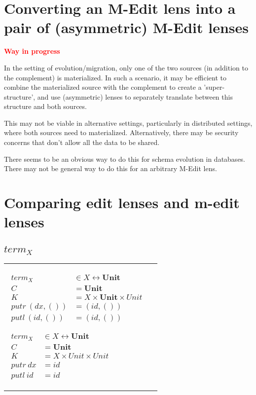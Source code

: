 \documentclass[a4paper,10pt]{article}
\newcommand{\finish}[1]{#1}
\newcommand{\comment}[1]{\finish{\textbf{\textcolor{red}{#1}}}}
\newcommand{\Unit}{\ensuremath{\mathbf{Unit}}}
\begin{document}
\section{Converting an M-Edit lens into a pair of (asymmetric) M-Edit lenses}
  \comment{Way in progress}

In the setting of evolution/migration, only one of the two sources (in addition to the complement) is materialized. In such a scenario, it may be efficient to combine the materialized source with the complement to create a 'super-structure', and use (asymmetric) lenses to separately translate between this structure and both sources. 

This may not be viable in alternative settings, particularly in distributed settings, where both sources need to materialized. Alternatively, there may be security concerns that don't allow all the data to be shared.

There seems to be an obvious way to do this for schema evolution in databases. There may not be general way to do this for an arbitrary M-Edit lens.

\section{Comparing edit lenses and m-edit lenses}

\subsection{$term_X$}

\begin{tabular}{ll}
  \begin{minipage}{0.5\linewidth}
    $\begin{aligned}
      term_X &\in X \leftrightarrow \Unit \\
      C &= \Unit \\
      K &= X \times \Unit \times Unit \\
      putr~(dx, ()) &= (id, ()) \\
      putl~(id, ()) &= (id, ())
    \end{aligned}$
  \end{minipage}
  \begin{minipage}{0.5\linewidth}
    $\begin{aligned}
      term_X &\in X \leftrightarrow \Unit \\
      C &= \Unit \\
      K &= X \times Unit \times Unit \\
      putr~dx &= id \\
      putl~id &= id 
    \end{aligned}$
  \end{minipage}
\end{tabular}
\end{document}
